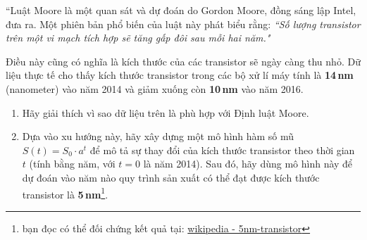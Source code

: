 \begin{exercise}
``Luật Moore là một quan sát và dự đoán do Gordon Moore, đồng sáng lập Intel, đưa ra. Một phiên bản phổ biến của luật này phát biểu rằng: \textit{``Số lượng transistor trên một vi mạch tích hợp sẽ tăng gấp đôi sau mỗi hai năm."}

Điều này cũng có nghĩa là kích thước của các transistor sẽ ngày càng thu nhỏ. Dữ liệu thực tế cho thấy kích thước transistor trong các bộ xử lí máy tính là \textbf{14\,nm} (nanometer) vào năm 2014 và giảm xuống còn \textbf{10\,nm} vào năm 2016.

\begin{enumerate}[label=(\alph*)]
    \item Hãy giải thích vì sao dữ liệu trên là phù hợp với Định luật Moore.
    
    \item Dựa vào xu hướng này, hãy xây dựng một mô hình hàm số mũ $S(t) = S_0 \cdot a^t$ để mô tả sự thay đổi của kích thước transistor theo thời gian $t$ (tính bằng năm, với $t=0$ là năm 2014). Sau đó, hãy dùng mô hình này để dự đoán vào năm nào quy trình sản xuất có thể đạt được kích thước transistor là \textbf{5\,nm}\footnote{bạn đọc có thể đối chứng kết quả tại: \href{https://en.m.wikipedia.org/wiki/5_nm_process}{wikipedia - 5nm-transistor}}.
\end{enumerate}
\end{exercise}